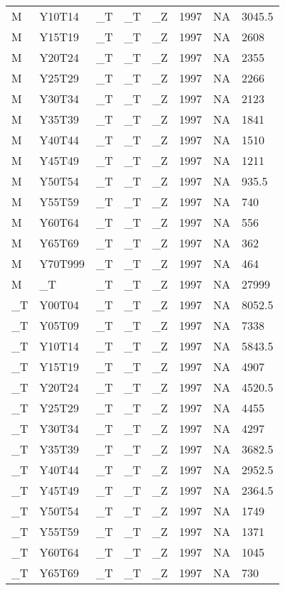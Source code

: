 \begin{longtable}[t]{llllllll}
\addlinespace
M & Y10T14 & \_T & \_T & \_Z & 1997 & NA & 3045.5\\
M & Y15T19 & \_T & \_T & \_Z & 1997 & NA & 2608\\
M & Y20T24 & \_T & \_T & \_Z & 1997 & NA & 2355\\
M & Y25T29 & \_T & \_T & \_Z & 1997 & NA & 2266\\
M & Y30T34 & \_T & \_T & \_Z & 1997 & NA & 2123\\
\addlinespace
M & Y35T39 & \_T & \_T & \_Z & 1997 & NA & 1841\\
M & Y40T44 & \_T & \_T & \_Z & 1997 & NA & 1510\\
M & Y45T49 & \_T & \_T & \_Z & 1997 & NA & 1211\\
M & Y50T54 & \_T & \_T & \_Z & 1997 & NA & 935.5\\
M & Y55T59 & \_T & \_T & \_Z & 1997 & NA & 740\\
\addlinespace
M & Y60T64 & \_T & \_T & \_Z & 1997 & NA & 556\\
M & Y65T69 & \_T & \_T & \_Z & 1997 & NA & 362\\
M & Y70T999 & \_T & \_T & \_Z & 1997 & NA & 464\\
M & \_T & \_T & \_T & \_Z & 1997 & NA & 27999\\
\_T & Y00T04 & \_T & \_T & \_Z & 1997 & NA & 8052.5\\
\addlinespace
\_T & Y05T09 & \_T & \_T & \_Z & 1997 & NA & 7338\\
\_T & Y10T14 & \_T & \_T & \_Z & 1997 & NA & 5843.5\\
\_T & Y15T19 & \_T & \_T & \_Z & 1997 & NA & 4907\\
\_T & Y20T24 & \_T & \_T & \_Z & 1997 & NA & 4520.5\\
\_T & Y25T29 & \_T & \_T & \_Z & 1997 & NA & 4455\\
\addlinespace
\_T & Y30T34 & \_T & \_T & \_Z & 1997 & NA & 4297\\
\_T & Y35T39 & \_T & \_T & \_Z & 1997 & NA & 3682.5\\
\_T & Y40T44 & \_T & \_T & \_Z & 1997 & NA & 2952.5\\
\_T & Y45T49 & \_T & \_T & \_Z & 1997 & NA & 2364.5\\
\_T & Y50T54 & \_T & \_T & \_Z & 1997 & NA & 1749\\
\addlinespace
\_T & Y55T59 & \_T & \_T & \_Z & 1997 & NA & 1371\\
\_T & Y60T64 & \_T & \_T & \_Z & 1997 & NA & 1045\\
\_T & Y65T69 & \_T & \_T & \_Z & 1997 & NA & 730\\

\end{longtable}
